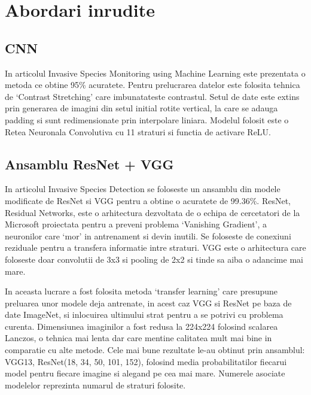 \documentclass{article}
\begin{document}
\section{Abordari inrudite}

\subsection{CNN}
In articolul Invasive Species Monitoring using Machine Learning\cite{WEBSITE:4} este prezentata o metoda ce obtine 95\% acuratete.  Pentru prelucrarea datelor este folosita tehnica de ‘Contrast Stretching’ care imbunatateste contrastul. Setul de date este extins prin generarea de imagini din setul initial rotite vertical, la care se adauga padding si sunt redimensionate prin interpolare liniara. Modelul folosit este o Retea Neuronala Convolutiva cu 11 straturi si functia de activare ReLU.

\subsection{Ansamblu ResNet + VGG}
In articolul Invasive Species Detection\cite{ARTICLE:1} se foloseste un ansamblu din modele modificate de ResNet si VGG pentru a obtine o acuratete de 99.36\%. ResNet, Residual Networks, este o arhitectura dezvoltata de o echipa de cercetatori de la Microsoft proiectata pentru a preveni problema ‘Vanishing Gradient’, a neuronilor care ‘mor’ in antrenament si devin inutili. Se foloseste de conexiuni reziduale pentru a transfera informatie intre straturi\cite{ARTICLE:2}. VGG este o arhitectura care foloseste doar convolutii de 3x3 si pooling de 2x2 si tinde sa aiba o adancime mai mare\cite{ARTICLE:3}.
 
In aceasta lucrare a fost folosita metoda ‘transfer learning’ care presupune preluarea unor modele deja antrenate, in acest caz VGG si ResNet pe baza de date ImageNet, si inlocuirea ultimului strat pentru a se potrivi cu problema curenta. Dimensiunea imaginilor a fost redusa la 224x224 folosind scalarea Lanczos, o tehnica mai lenta dar care mentine calitatea mult mai bine in comparatie cu alte metode. Cele mai bune rezultate le-au obtinut prin ansamblul: VGG13, ResNet(18, 34, 50, 101, 152), folosind media probabilitatilor fiecarui model pentru fiecare imagine si alegand pe cea mai mare. Numerele asociate modelelor reprezinta numarul de straturi folosite.
\end{document}
